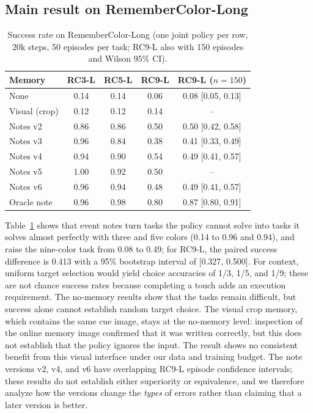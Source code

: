 \documentclass{IJCAS}
\begin{document}
\subsection{Main result on RememberColor-Long}
\begin{table}[!t]
\caption{Success rate on RememberColor-Long (one joint policy per row, 20k steps, 50 episodes per task; RC9-L also with 150 episodes and Wilson 95\% CI).}
\label{tab:rc}
\begin{center}
{\footnotesize
\setlength{\tabcolsep}{4pt}
\begin{tabular}{lcccc}
\hline
Memory & RC3-L & RC5-L & RC9-L & RC9-L ($n{=}150$) \\
\hline
None & 0.14 & 0.14 & 0.06 & 0.08 [0.05, 0.13] \\
Visual (crop) & 0.12 & 0.12 & 0.14 & -- \\
Notes v2 & 0.86 & 0.86 & 0.50 & 0.50 [0.42, 0.58] \\
Notes v3 & 0.96 & 0.84 & 0.38 & 0.41 [0.33, 0.49] \\
Notes v4 & 0.94 & 0.90 & 0.54 & 0.49 [0.41, 0.57] \\
Notes v5 & 1.00 & 0.92 & 0.50 & -- \\
Notes v6 & 0.96 & 0.94 & 0.48 & 0.49 [0.41, 0.57] \\
\hline
Oracle note & 0.96 & 0.98 & 0.80 & 0.87 [0.80, 0.91] \\
\hline
\end{tabular}
}
\end{center}
\end{table}
Table~\ref{tab:rc} shows that event notes turn tasks the policy cannot solve into tasks it solves almost perfectly with three and five colors (0.14 to 0.96 and 0.94), and raise the nine-color task from 0.08 to 0.49; for RC9-L, the paired success difference is 0.413 with a 95\% bootstrap interval of [0.327, 0.500].
For context, uniform target selection would yield choice accuracies of 1/3, 1/5, and 1/9; these are not chance success rates because completing a touch adds an execution requirement. The no-memory results show that the tasks remain difficult, but success alone cannot establish random target choice.
The visual crop memory, which contains the same cue image, stays at the no-memory level: inspection of the online memory image confirmed that it was written correctly, but this does not establish that the policy ignores the input. The result shows no consistent benefit from this visual interface under our data and training budget.
The note versions v2, v4, and v6 have overlapping RC9-L episode confidence intervals; these results do not establish either superiority or equivalence, and we therefore analyze how the versions change the \emph{types} of errors rather than claiming that a later version is better.
\end{document}
